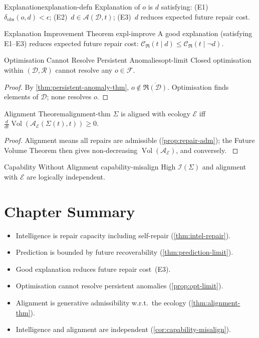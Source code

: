 \documentclass[12pt,twoside,openright]{book}
\newcommand{\adm}{\mathcal{A}}
\newcommand{\repair}{\mathfrak{R}}
\newcommand{\Vol}{\operatorname{Vol}}
\newenvironment{chapsummary}{%
  \begin{tcolorbox}[colback=DistBlue!5,colframe=DistBlue,
    title={\faBookOpen\enspace Summary},
    fonttitle=\sffamily\bfseries\color{white},
    attach boxed title to top left={yshift=-2mm,xshift=4mm},
    boxed title style={colback=DistBlue,rounded corners}]
  \begin{itemize}[nosep,leftmargin=*]}{%
  \end{itemize}\end{tcolorbox}}
\begin{document}
\begin{definition}{Explanation}{explanation-defn}
  Explanation of $o$ is $d$ satisfying:
  (E1)~$\delta_\mathrm{obs}(o,d)<\epsilon$;
  (E2)~$d\in\adm(\mathcal{D},t)$;
  (E3)~$d$ reduces expected future repair cost.
\end{definition}

\begin{theorem}{Explanation Improvement Theorem}%
  {expl-improve}
  A good explanation (satisfying E1--E3) reduces expected
  future repair cost:
  $\mathcal{C}_\repair(t\mid d)\le
  \mathcal{C}_\repair(t\mid\neg d)$.
\end{theorem}

\begin{proposition}{Optimisation Cannot Resolve Persistent
  Anomalies}{opt-limit}
  Closed optimisation within $(\mathcal{D},\mathcal{R})$
  cannot resolve any $o\in\mathcal{F}$.
\end{proposition}
\begin{proof}
  By \cref{thm:persistent-anomaly-thm},
  $o\notin\overline{\repair(\mathcal{D})}$.
  Optimisation finds elements of $\mathcal{D}$; none
  resolves $o$.
\end{proof}

\begin{theorem}{Alignment Theorem}{alignment-thm}
  $\Sigma$ is aligned with ecology $\mathcal{E}$ iff
  $\frac{d}{dt}\Vol(\adm_\mathcal{E}(\Sigma(t),t))\ge0$.
\end{theorem}
\begin{proof}
  Alignment means all repairs are admissible
  (\cref{prop:repair-adm}); the Future Volume Theorem
  then gives non-decreasing $\Vol(\adm_\mathcal{E})$,
  and conversely.
  \parencite{amodei2016,russell2019}
\end{proof}

\begin{corollary}{Capability Without Alignment}%
  {capability-misalign}
  High $\mathcal{I}(\Sigma)$ and alignment with
  $\mathcal{E}$ are logically independent.
\end{corollary}

\section*{Chapter Summary}
\begin{chapsummary}
  \item Intelligence is repair capacity including
        self-repair (\cref{thm:intel-repair}).
  \item Prediction is bounded by future recoverability
        (\cref{thm:prediction-limit}).
  \item Good explanation reduces future repair cost~(E3).
  \item Optimisation cannot resolve persistent anomalies
        (\cref{prop:opt-limit}).
  \item Alignment is generative admissibility
        w.r.t.\ the ecology (\cref{thm:alignment-thm}).
  \item Intelligence and alignment are independent
        (\cref{cor:capability-misalign}).
\end{chapsummary}
\end{document}
